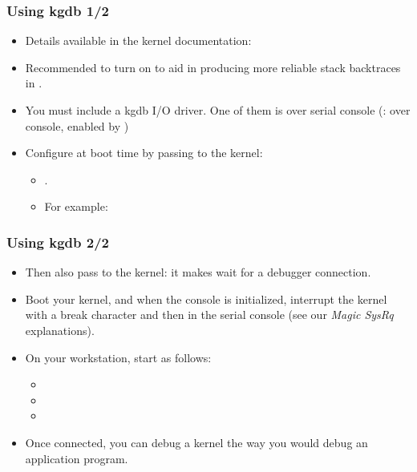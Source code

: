 \begin{frame}
  \frametitle{Using kgdb 1/2}
  \begin{itemize}
  \item Details available in the kernel documentation:
  \item Recommended to turn on  to aid in
    producing more reliable stack backtraces in .
  \item You must include a kgdb I/O driver. One of them is  over
    serial console (:  over console, enabled by
    )
  \item Configure  at boot time by passing to the kernel:
    \begin{itemize}
    \item {}.
    \item For example: 
    \end{itemize}
  \end{itemize}
\end{frame}

\begin{frame}
  \frametitle{Using kgdb 2/2}
  \begin{itemize}
  \item Then also pass  to the kernel: it makes
     wait for a debugger connection.
  \item Boot your kernel, and when the console is initialized,
    interrupt the kernel with a break character and then 
    in the serial console (see our {\em Magic SysRq} explanations).
  \item On your workstation, start  as follows:
    \begin{itemize}
    \item {}
    \item {}
    \item {}
    \end{itemize}
  \item Once connected, you can debug a kernel the way you would debug
    an application program.
  \end{itemize}
\end{frame}

